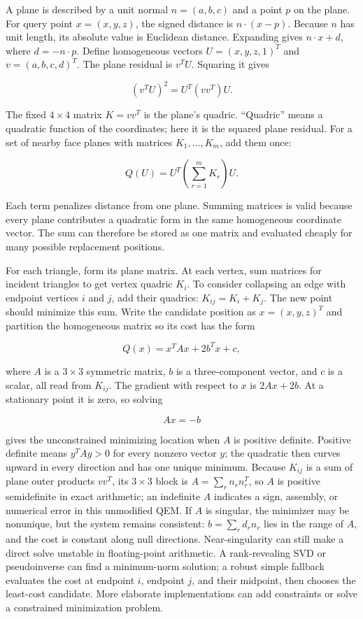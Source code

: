 A plane is described by a unit normal \(n=(a,b,c)\) and a point \(p\) on the plane. For query point \(x=(x,y,z)\), the signed distance is \(n\cdot(x-p)\). Because \(n\) has unit length, its absolute value is Euclidean distance. Expanding gives \(n\cdot x+d\), where \(d=-n\cdot p\). Define homogeneous vectors \(U=(x,y,z,1)^T\) and \(v=(a,b,c,d)^T\). The plane residual is \(v^TU\). Squaring it gives

\[
(v^TU)^2=U^T(vv^T)U.
\]

The fixed \(4\times4\) matrix \(K=vv^T\) is the plane's quadric. ``Quadric'' means a quadratic function of the coordinates; here it is the squared plane residual. For a set of nearby face planes with matrices \(K_1,\ldots,K_m\), add them once:

\[
Q(U)=U^T\left(\sum_{r=1}^{m}K_r\right)U.
\]

Each term penalizes distance from one plane. Summing matrices is valid because every plane contributes a quadratic form in the same homogeneous coordinate vector. The sum can therefore be stored as one matrix and evaluated cheaply for many possible replacement positions.

For each triangle, form its plane matrix. At each vertex, sum matrices for incident triangles to get vertex quadric \(K_i\). To consider collapsing an edge with endpoint vertices \(i\) and \(j\), add their quadrics: \(K_{ij}=K_i+K_j\). The new point should minimize this sum. Write the candidate position as \(x=(x,y,z)^T\) and partition the homogeneous matrix so its cost has the form

\[
Q(x)=x^TAx+2b^Tx+c,
\]

where \(A\) is a \(3\times3\) symmetric matrix, \(b\) is a three-component vector, and \(c\) is a scalar, all read from \(K_{ij}\). The gradient with respect to \(x\) is \(2Ax+2b\). At a stationary point it is zero, so solving

\[
Ax=-b
\]

gives the unconstrained minimizing location when \(A\) is positive definite. Positive definite means \(y^TAy>0\) for every nonzero vector \(y\); the quadratic then curves upward in every direction and has one unique minimum. Because \(K_{ij}\) is a sum of plane outer products \(vv^T\), its \(3\times3\) block is \(A=\sum_r n_r n_r^T\), so \(A\) is positive semidefinite in exact arithmetic; an indefinite \(A\) indicates a sign, assembly, or numerical error in this unmodified QEM. If \(A\) is singular, the minimizer may be nonunique, but the system remains consistent: \(b=\sum_r d_r n_r\) lies in the range of \(A\), and the cost is constant along null directions. Near-singularity can still make a direct solve unstable in floating-point arithmetic. A rank-revealing SVD or pseudoinverse can find a minimum-norm solution; a robust simple fallback evaluates the cost at endpoint \(i\), endpoint \(j\), and their midpoint, then chooses the least-cost candidate. More elaborate implementations can add constraints or solve a constrained minimization problem.

